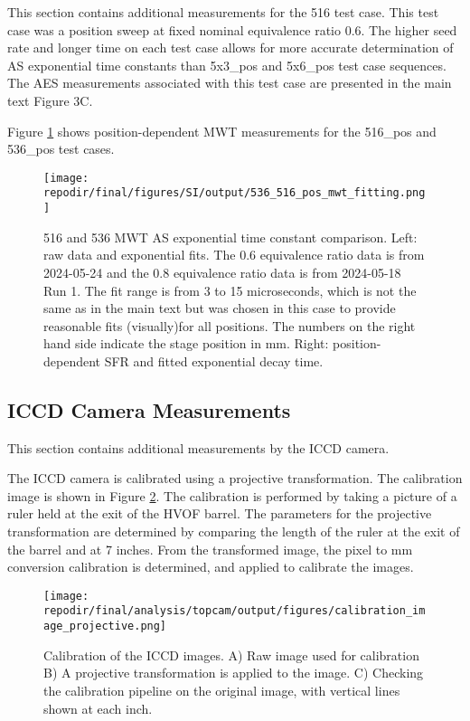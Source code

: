 This section contains additional measurements for the 516 test case. This test case was a position sweep at fixed nominal equivalence ratio 0.6. The higher seed rate and longer time on each test case allows for more accurate determination of AS exponential time constants than 5x3\_pos and 5x6\_pos test case sequences. The AES measurements associated with this test case are presented in the main text Figure 3C.

Figure \ref{fig:SI_536_516_pos_mwt_fitting} shows position-dependent MWT measurements for the 516\_pos and 536\_pos test cases. 


\begin{figure}[]
\centering
\texttt{[image: \\repodir/final/figures/SI/output/536\_516\_pos\_mwt\_fitting.png]}
\caption{516 and 536 MWT AS exponential time constant comparison. Left: raw data and exponential fits. The 0.6 equivalence ratio data is from 2024-05-24 and the 0.8 equivalence ratio data is from 2024-05-18 Run 1. The fit range is from 3 to 15 microseconds, which is not the same as in the main text but was chosen in this case to provide reasonable fits (visually)for all positions. The numbers on the right hand side indicate the stage position in mm. Right: position-dependent SFR and fitted exponential decay time.}
\label{fig:SI_536_516_pos_mwt_fitting}
\end{figure}


\clearpage
\subsection{ICCD Camera Measurements}

This section contains additional measurements by the ICCD camera. 

The ICCD camera is calibrated using a projective transformation. The calibration image is shown in Figure \ref{fig:SI_iccd_calibration}. The calibration is performed by taking a picture of a ruler held at the exit of the HVOF barrel. The parameters for the projective transformation are determined by comparing the length of the ruler at the exit of the barrel and at 7 inches. From the transformed image, the pixel to mm conversion calibration is determined, and applied to calibrate the images. 

\begin{figure}[]
\centering
\texttt{[image: \\repodir/final/analysis/topcam/output/figures/calibration\_image\_projective.png]}
\caption{Calibration of the ICCD images. A) Raw image used for calibration B) A projective transformation is applied to the image. C) Checking the calibration pipeline on the original image, with vertical lines shown at each inch.}
\label{fig:SI_iccd_calibration}
\end{figure}

